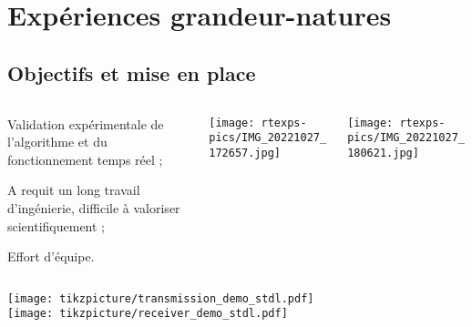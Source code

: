 \documentclass[../main.tex]{subfiles}
\begin{document}
\section{Expériences grandeur-natures}

\subsection{Objectifs et mise en place}

\begin{frame}{\subsecname}
  \begin{columns}
    \begin{column}{.5\linewidth}
      \centering
      \begin{ctrlitemize}{.5 em}
        \item Validation expérimentale de l'algorithme et du fonctionnement temps réel ;
        \item A requit un long travail d'ingénierie, difficile à valoriser scientifiquement ;
        \item Effort d'équipe.
      \end{ctrlitemize}
    \end{column}
    \begin{column}{.5\linewidth}
      \begin{columns}
        \begin{column}{.5\linewidth}
          \centering
          \texttt{[image: rtexps-pics/IMG\_20221027\_172657.jpg]}
        \end{column}
        \begin{column}{.5\linewidth}
          \centering
          \texttt{[image: rtexps-pics/IMG\_20221027\_180621.jpg]}
        \end{column}
      \end{columns}
    \end{column}
  \end{columns}

  \vspace{1 em}

  \begin{columns}
    \begin{column}{.95\linewidth}
      \texttt{[image: tikzpicture/transmission\_demo\_stdl.pdf]} \hfill \vspace{.5 em} \\
      \hfill \texttt{[image: tikzpicture/receiver\_demo\_stdl.pdf]}
    \end{column}
  \end{columns}
\end{frame}
\end{document}
